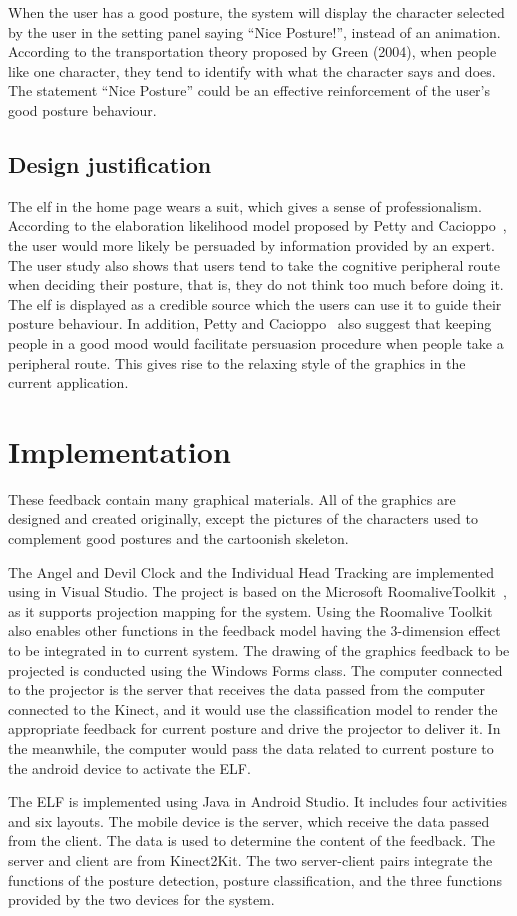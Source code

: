 When the user has a good posture, the system will display the character selected by the user in the setting panel saying ``Nice Posture!'', instead of an animation. According to the transportation theory proposed by Green (2004), when people like one character, they tend to identify with what the character says and does. The statement ``Nice Posture'' could be an effective reinforcement of the user's good posture behaviour.

\subsection{Design justification}
The elf in the home page wears a suit, which gives a sense of professionalism. According to the elaboration likelihood model proposed by Petty and Cacioppo~\cite{elaboration_modeL_persuasion}, the user would more likely be persuaded by information provided by an expert. The user study also shows that users tend to take the cognitive peripheral route when deciding their posture, that is, they do not think too much before doing it. The elf is displayed as a credible source which the users can use it to guide their posture behaviour. In addition, Petty and Cacioppo~\cite{elaboration_modeL_persuasion} also suggest that keeping people in a good mood would facilitate persuasion procedure when people take a peripheral route. This gives rise to the relaxing style of the graphics in the current application.

\section{Implementation}
These feedback contain many graphical materials. All of the graphics are designed and created originally, except the pictures of the characters used to complement good postures and the cartoonish skeleton.

The Angel and Devil Clock and the Individual Head Tracking are implemented using \Csharp{} in Visual Studio. The project is based on the Microsoft RoomaliveToolkit~\cite{roomalive_toolkit}, as it supports projection mapping for the system. Using the Roomalive Toolkit also enables other functions in the feedback model having the 3-dimension effect to be integrated in to current system. The drawing of the graphics feedback to be projected is conducted using the Windows Forms class. The computer connected to the projector is the server that receives the data passed from the computer connected to the Kinect, and it would use the classification model to render the appropriate feedback for current posture and drive the projector to deliver it. In the meanwhile, the computer would pass the data related to current posture to the android device to activate the ELF.

The ELF is implemented using Java in Android Studio. It includes four activities and six layouts. The mobile device is the server, which receive the data passed from the client. The data is used to determine the content of the feedback. The server and client are from Kinect2Kit\cite{kinect2kit}. The two server-client pairs integrate the functions of the posture detection, posture classification, and the three functions provided by the two devices for the system.
